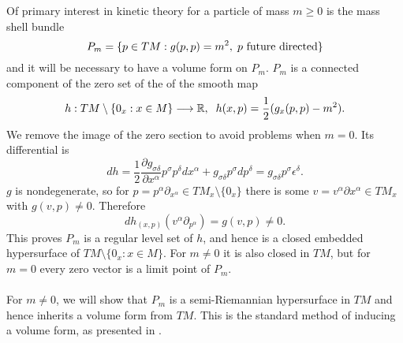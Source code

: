 Of primary interest in kinetic theory for a particle of mass $m\geq 0$ is the mass shell bundle
\begin{equation}
P_m=\{p\in TM :g(p,p)=m^2,\hspace{1mm}  p\text{ future directed}\}
\end{equation}
and it will be necessary to have a volume form on $P_m$.  $P_m$ is a connected component of the zero set of the of the smooth map 
\begin{equation}\label{defining_function}
h:TM\setminus \{0_x:x\in M\}\longrightarrow \mathbb{R},\hspace{2mm} h(x,p)= \frac{1}{2}(g_x(p,p)-m^2).  
\end{equation} 
We remove the image of the zero section to avoid problems when $m=0$.  Its differential is
\begin{equation}\label{dh}
dh=\frac{1}{2}\frac{\partial g_{\sigma\delta}}{\partial x^\alpha}p^\sigma p^\delta dx^\alpha+g_{\sigma\delta}p^\sigma dp^\delta=g_{\sigma\delta}p^\sigma\epsilon^\delta.
\end{equation}
$g$ is nondegenerate, so for $p=p^{\alpha}\partial_{x^\alpha}\in TM_x\setminus{\{0_x\}}$ there is some $v=v^\alpha\partial{x^\alpha}\in TM_x$ with $g(v,p)\neq 0$.  Therefore
\begin{equation}
dh_{(x,p)}(v^\alpha\partial_{p^\alpha})=g(v,p)\neq 0.
\end{equation}
This proves $P_m$ is a regular level set of $h$, and hence is a closed embedded hypersurface of $TM\setminus \{0_x:x\in M\}$.  For $m\neq 0$ it is also closed in $TM$, but for $m=0$ every zero vector is a limit point of $P_m$.\\

\\
For $m\neq 0$, we will show that $P_m$ is a semi-Riemannian hypersurface in $TM$ and hence inherits a volume form from $TM$. This is the standard method of inducing a volume form, as presented in \cite{tsamparlis}.  

